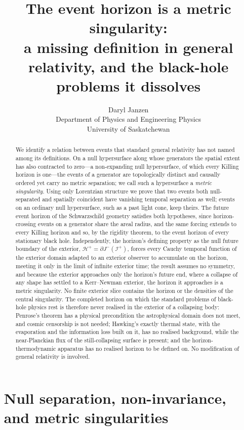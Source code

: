 \documentclass[11pt,a4paper]{article}
\title{The event horizon is a metric singularity:\\
\large a missing definition in general relativity, and the black-hole problems it dissolves}
\author{Daryl Janzen\\
\small Department of Physics and Engineering Physics\\
\small University of Saskatchewan}
\date{}
\theoremstyle{plain}
\theoremstyle{remark}
\begin{document}
\maketitle

\begin{abstract}
We identify a relation between events that standard general relativity has not named among its
definitions. On a null hypersurface along whose generators the spatial extent has also contracted to
zero---a non-expanding null hypersurface, of which every Killing horizon is one---the events of a
generator are topologically distinct and causally ordered yet carry no metric separation; we call such a
hypersurface a \emph{metric singularity}. Using only Lorentzian structure we prove that two events both
null-separated and spatially coincident have vanishing temporal separation as well; events on an ordinary
null hypersurface, such as a past light cone, keep theirs. The future event horizon of the Schwarzschild
geometry satisfies both hypotheses, since horizon-crossing events on a generator share the areal radius, and
the same forcing extends to every Killing horizon and so, by the rigidity theorem, to the event horizon of
every stationary black hole. Independently, the horizon's defining property as the null future boundary of
the exterior, $\mathcal{H}^+=\partial J^-(\mathscr{I}^+)$, forces every Cauchy temporal function of the
exterior domain adapted to an exterior observer to accumulate on the horizon, meeting it only in the limit of
infinite exterior time; the result assumes no symmetry, and because the exterior approaches only the
horizon's future end, where a collapse of any shape has settled to a Kerr--Newman exterior, the horizon it
approaches is a metric singularity. No finite exterior slice contains the horizon or the densities of the
central singularity. The completed horizon on which the standard problems of black-hole physics rest is
therefore never realised in the exterior of a collapsing body: Penrose's theorem has a physical precondition
the astrophysical domain does not meet, and cosmic censorship is not needed; Hawking's exactly thermal state,
with the evaporation and the information loss built on it, has no realised background, while the
near-Planckian flux of the still-collapsing surface is present; and the
horizon-thermodynamic apparatus has no realised horizon to be defined on. No modification of general
relativity is involved.
\end{abstract}

\section{Null separation, non-invariance, and metric singularities}\label{sec:1}
\end{document}

